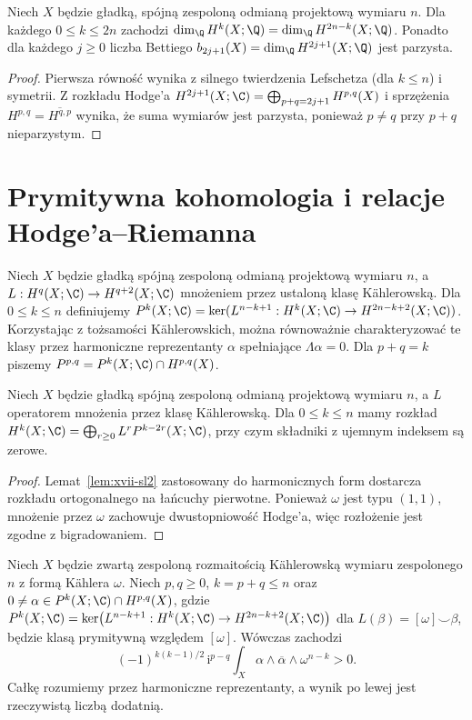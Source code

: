 \begin{wniosek}
Niech $X$ będzie gładką, spójną zespoloną
odmianą projektową wymiaru $n$.
Dla każdego $0\le k\le2n$ zachodzi
$\dim_\Q H^k(X;\Q)=\dim_\Q H^{2n-k}(X;\Q)$.
Ponadto dla każdego $j\ge0$ liczba Bettiego
$b_{2j+1}(X)=\dim_\Q H^{2j+1}(X;\Q)$ jest parzysta.
\end{wniosek}
\begin{proof}
Pierwsza równość wynika z silnego twierdzenia Lefschetza
(dla $k\le n$) i symetrii.
Z rozkładu Hodge'a $H^{2j+1}(X;\C)=
\bigoplus_{p+q=2j+1}H^{p,q}(X)$ i sprzężenia
$H^{p,q}=\overline{H^{q,p}}$ wynika, że suma wymiarów
jest parzysta, ponieważ $p\ne q$ przy $p+q$ nieparzystym.
\end{proof}

\section{Prymitywna kohomologia i relacje Hodge'a--Riemanna}
\begin{definicja}
Niech $X$ będzie gładką spójną zespoloną odmianą
projektową wymiaru $n$, a
$L:H^q(X;\C)\to H^{q+2}(X;\C)$
mnożeniem przez ustaloną klasę Kählerowską.
Dla $0\le k\le n$ definiujemy
$P^k(X;\C)=\ker(L^{n-k+1}:H^k(X;\C)\to H^{2n-k+2}(X;\C))$.
Korzystając z tożsamości Kählerowskich, można równoważnie
charakteryzować te klasy przez harmoniczne reprezentanty
$\alpha$ spełniające $\Lambda\alpha=0$.
Dla $p+q=k$ piszemy $P^{p,q}=P^k(X;\C)\cap H^{p,q}(X)$.
\end{definicja}
\begin{twierdzenie}
\label{thm:xvii-decomposition}
Niech $X$ będzie gładką spójną zespoloną
odmianą projektową wymiaru $n$,
a $L$ operatorem mnożenia przez klasę Kählerowską.
Dla $0\le k\le n$ mamy rozkład
$H^k(X;\C)=\bigoplus_{r\ge0}L^rP^{k-2r}(X;\C)$,
przy czym składniki z ujemnym indeksem są zerowe.
\end{twierdzenie}
\begin{proof}
Lemat~\ref{lem:xvii-sl2} zastosowany do harmonicznych form
dostarcza rozkładu ortogonalnego na łańcuchy pierwotne.
Ponieważ $\omega$ jest typu $(1,1)$, mnożenie przez
$\omega$ zachowuje dwustopniowość Hodge'a, więc
rozłożenie jest zgodne z bigradowaniem.
\end{proof}
\begin{twierdzenie}
\label{thm:xvii-HR}
Niech $X$ będzie zwartą zespoloną rozmaitością
Kählerowską wymiaru zespolonego $n$ z formą
Kählera $\omega$. Niech $p,q\ge0$,
$k=p+q\le n$ oraz
$0\ne\alpha\in P^k(X;\C)\cap H^{p,q}(X)$,
gdzie
$P^k(X;\C)=\ker\bigl(L^{n-k+1}:H^k(X;\C)
\to H^{2n-k+2}(X;\C)\bigr)$
dla $L(\beta)=[\omega]\smile\beta$,
będzie klasą prymitywną względem $[\omega]$.
Wówczas zachodzi
\[
(-1)^{k(k-1)/2}\,\mathrm i^{p-q}
\int_X\alpha\wedge\overline\alpha\wedge\omega^{n-k}>0.
\]
Całkę rozumiemy przez harmoniczne reprezentanty,
a wynik po lewej jest rzeczywistą liczbą dodatnią.
\end{twierdzenie}
